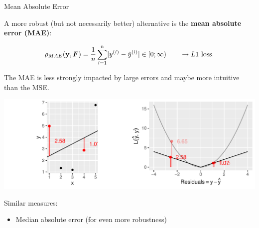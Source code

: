 \begin{vbframe}{Mean Absolute Error}

A more robust (but not necessarily better) alternative is the 
\textbf{mean absolute error (MAE)}:

$$ 
\rho_{MAE}(\mathbf{y}, \boldsymbol{F}) = \frac{1}{n} \sum\limits_{i=1}^n \rvert y^{(i)} - \hat{y}^{(i)} \rvert \in [0;\infty) \qquad \rightarrow L1 
\text{ loss}.
$$

\begin{minipage}[c]{0.33\textwidth}
  \raggedright
  \small
  The MAE is less strongly impacted by large errors and maybe more 
  intuitive than the MSE.
\end{minipage}%
\begin{minipage}[c]{0.67\textwidth}
  \begin{knitrout}\scriptsize
  \color{fgcolor}
  {\includegraphics[width=\textwidth]{figure/plot_abs_loss}}
\end{knitrout}
\end{minipage}

\small
Similar measures:

\begin{itemize}
  \small
  \item Median absolute error (for even more robustness)
\end{itemize}

\end{vbframe}


